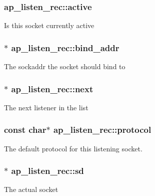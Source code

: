 \subsubsection[{\texorpdfstring{active}{active}}]{ ap\+\_\+listen\+\_\+rec\+::active}\hypertarget{structap__listen__rec_a6c337d54da0ca7efccf3923a3e526bb1}{}\label{structap__listen__rec_a6c337d54da0ca7efccf3923a3e526bb1}
Is this socket currently active 
\subsubsection[{\texorpdfstring{bind\+\_\+addr}{bind_addr}}]{$\ast$ ap\+\_\+listen\+\_\+rec\+::bind\+\_\+addr}\hypertarget{structap__listen__rec_aeb6a228184b3338fc4130859ccaac7ea}{}\label{structap__listen__rec_aeb6a228184b3338fc4130859ccaac7ea}
The sockaddr the socket should bind to 
\subsubsection[{\texorpdfstring{next}{next}}]{$\ast$ ap\+\_\+listen\+\_\+rec\+::next}\hypertarget{structap__listen__rec_a4240c0e22e20ef521ba64dc91dbaba10}{}\label{structap__listen__rec_a4240c0e22e20ef521ba64dc91dbaba10}
The next listener in the list 
\subsubsection[{\texorpdfstring{protocol}{protocol}}]{\setlength{\rightskip}{0pt plus 5cm}const char$\ast$ ap\+\_\+listen\+\_\+rec\+::protocol}\hypertarget{structap__listen__rec_a70ffffc8d550a4d8dc790951d7613876}{}\label{structap__listen__rec_a70ffffc8d550a4d8dc790951d7613876}
The default protocol for this listening socket. 
\subsubsection[{\texorpdfstring{sd}{sd}}]{$\ast$ ap\+\_\+listen\+\_\+rec\+::sd}\hypertarget{structap__listen__rec_af3eece1c155de1c17e4cdaa5c28873f9}{}\label{structap__listen__rec_af3eece1c155de1c17e4cdaa5c28873f9}
The actual socket 
